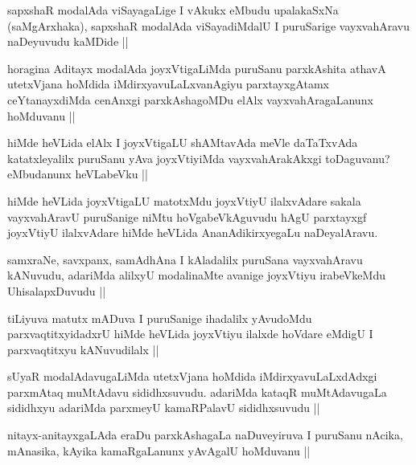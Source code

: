 \begin{artha}
sapxshaR modalAda viSayagaLige I vAkukx eMbudu upalakaSxNa (saMgArxhaka), sapxshaR modalAda viSayadiMdalU I puruSarige vayxvahAravu naDeyuvudu kaMDide ||
\end{artha}

\begin{artha}
horagina Aditayx modalAda joyxVtigaLiMda puruSanu parxkAshita athavA utetxVjana hoMdida iMdirxyavuLaLxvanAgiyu parxtayxgAtamx ceYtanayxdiMda cenAnxgi parxkAshagoMDu elAlx vayxvahAragaLanunx hoMduvanu ||
\end{artha}

\begin{artha}
hiMde heVLida elAlx I joyxVtigaLU shAMtavAda meVle daTaTxvAda katatxleyalilx puruSanu yAva joyxVtiyiMda vayxvahArakAkxgi toDaguvanu? eMbudanunx heVLabeVku ||
\end{artha}

\begin{artha}
hiMde heVLida joyxVtigaLU matotxMdu joyxVtiyU ilalxvAdare sakala vayxvahAravU puruSanige niMtu hoVgabeVkAguvudu hAgU parxtayxgf joyxVtiyU ilalxvAdare hiMde heVLida AnanAdikirxyegaLu naDeyalAravu.
\end{artha}

\begin{artha}
samxraNe, savxpanx, samAdhAna I kAladalilx puruSana vayxvahAravu kANuvudu, adariMda alilxyU modalinaMte avanige joyxVtiyu irabeVkeMdu UhisalapxDuvudu ||
\end{artha}

\begin{artha}
tiLiyuva matutx mADuva I puruSanige ihadalilx yAvudoMdu parxvaqtitxyidadxrU hiMde heVLida joyxVtiyu ilalxde hoVdare eMdigU I parxvaqtitxyu kANuvudilalx ||
\end{artha}

\begin{artha}
sUyaR modalAdavugaLiMda utetxVjana hoMdida iMdirxyavuLaLxdAdxgi parxmAtaq muMtAdavu sididhxsuvudu. adariMda kataqR muMtAdavugaLa sididhxyu adariMda parxmeyU kamaRPalavU sididhxsuvudu ||
\end{artha}

\begin{artha}
nitayx-anitayxgaLAda eraDu parxkAshagaLa naDuveyiruva I puruSanu nAcika, mAnasika, kAyika kamaRgaLanunx yAvAgalU hoMduvanu ||
\end{artha}

